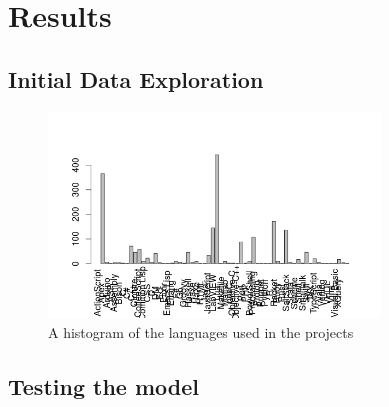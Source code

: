 \section{Results}
    \subsection{Initial Data Exploration}
	    \begin{figure}
	        \includegraphics[width=250pt]{figures/language-frequency}
	        \caption{A histogram of the languages used in the projects}
	        \label{fig:language-frequency-plot}
	    \end{figure}
    
    \subsection{Testing the model}

